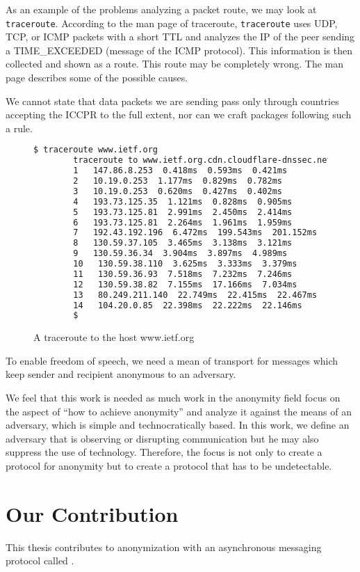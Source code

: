As an example of the problems analyzing a packet route, we may look at \verb|traceroute|. According to the man page of traceroute, \verb|traceroute| uses UDP, TCP, or ICMP packets with a short TTL and analyzes the IP of the peer sending a TIME\_EXCEEDED (message of the ICMP protocol). This information is then collected and shown as a route. This route may be completely wrong. The man page describes some of the possible causes.

We cannot state that data packets we are sending pass only through countries accepting the ICCPR to the full extent, nor can we craft packages following such a rule.

\begin{figure}[H]
	\begin{lstlisting}[language=bash,breaklines=true,basicstyle=\tiny]
		$ traceroute www.ietf.org
		traceroute to www.ietf.org.cdn.cloudflare-dnssec.net (104.20.0.85), 64 hops max
		1   147.86.8.253  0.418ms  0.593ms  0.421ms
		2   10.19.0.253  1.177ms  0.829ms  0.782ms
		3   10.19.0.253  0.620ms  0.427ms  0.402ms
		4   193.73.125.35  1.121ms  0.828ms  0.905ms
		5   193.73.125.81  2.991ms  2.450ms  2.414ms
		6   193.73.125.81  2.264ms  1.961ms  1.959ms
		7   192.43.192.196  6.472ms  199.543ms  201.152ms
		8   130.59.37.105  3.465ms  3.138ms  3.121ms
		9   130.59.36.34  3.904ms  3.897ms  4.989ms
		10   130.59.38.110  3.625ms  3.333ms  3.379ms
		11   130.59.36.93  7.518ms  7.232ms  7.246ms
		12   130.59.38.82  7.155ms  17.166ms  7.034ms
		13   80.249.211.140  22.749ms  22.415ms  22.467ms
		14   104.20.0.85  22.398ms  22.222ms  22.146ms
		$
	\end{lstlisting}
	\caption{A traceroute to the host www.ietf.org}
\end{figure}

To enable freedom of speech, we need a mean of transport for messages which keep sender and recipient anonymous to an adversary.

We feel that this work is needed as much work in the anonymity field focus on the aspect of ``how to achieve anonymity'' and analyze it against the means of an adversary, which is simple and technocratically based. In this work, we define an adversary that is observing or disrupting communication but he may also suppress the use of technology. Therefore, the focus is not only to create a protocol for anonymity but to create a protocol that has to be undetectable.

\chapter{Our Contribution}
This thesis contributes to anonymization with an asynchronous messaging protocol called \MessageVortex.

